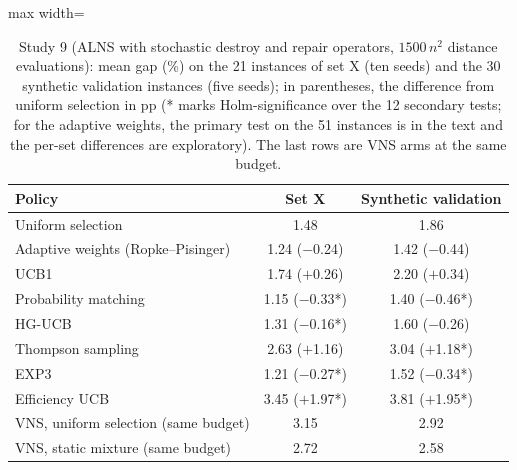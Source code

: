 \begin{table}[t]
\caption{Study 9 (ALNS with stochastic destroy and repair operators, $1500\,n^2$ distance evaluations): mean gap (\%) on the 21 instances of set X (ten seeds) and the 30 synthetic validation instances (five seeds); in parentheses, the difference from uniform selection in pp (* marks Holm-significance over the 12 secondary tests; for the adaptive weights, the primary test on the 51 instances is in the text and the per-set differences are exploratory). The last rows are VNS arms at the same budget.}\label{tab:s9}
\centering
\small
\begin{adjustbox}{max width=\linewidth}
\begin{tabular}{lcc}
\toprule
Policy & Set X & Synthetic validation \\
\midrule
Uniform selection & 1.48 & 1.86 \\
Adaptive weights (Ropke--Pisinger) & 1.24 ($-$0.24) & 1.42 ($-$0.44) \\
UCB1 & 1.74 ($+$0.26) & 2.20 ($+$0.34) \\
Probability matching & 1.15 ($-$0.33*) & 1.40 ($-$0.46*) \\
HG-UCB & 1.31 ($-$0.16*) & 1.60 ($-$0.26) \\
Thompson sampling & 2.63 ($+$1.16) & 3.04 ($+$1.18*) \\
EXP3 & 1.21 ($-$0.27*) & 1.52 ($-$0.34*) \\
Efficiency UCB & 3.45 ($+$1.97*) & 3.81 ($+$1.95*) \\
VNS, uniform selection (same budget) & 3.15 & 2.92 \\
VNS, static mixture (same budget) & 2.72 & 2.58 \\
\bottomrule
\end{tabular}
\end{adjustbox}
\end{table}
